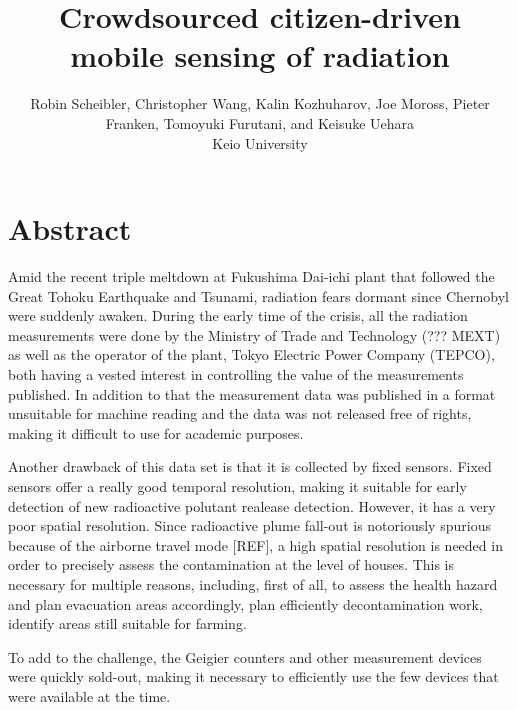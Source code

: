 \documentclass[11pt]{article}
\newcommand*{\TitleFont}{%
  \Large\usefont{T1}{phv}{b}{n}%
    \selectfont}
\newcommand*{\AuthorFont}{%
  \normalsize\usefont{T1}{\rmdefault}{m}{n}%
    \selectfont}
\begin{document}
%
\title{\TitleFont Crowdsourced citizen-driven mobile sensing of radiation}



\author{
  \AuthorFont
  Robin Scheibler, Christopher Wang, Kalin Kozhuharov, Joe Moross, Pieter Franken, Tomoyuki Furutani, and Keisuke Uehara \\
  Keio University
}

\maketitle

\section*{Abstract}
\label{sec:abstract}

Amid the recent triple meltdown at Fukushima Dai-ichi plant that followed the Great Tohoku Earthquake and Tsunami, radiation fears dormant since Chernobyl were suddenly awaken.
During the early time of the crisis, all the radiation measurements were done by the Ministry of Trade and Technology (??? MEXT) as well as the operator of the
plant, Tokyo Electric Power Company (TEPCO), both having a vested interest in controlling the value of the measurements published. In addition to that the measurement
data was published in a format unsuitable for machine reading and the data was not released free of rights, making it difficult to use for academic purposes.

Another drawback of this data set is that it is collected by fixed sensors. Fixed sensors offer a really good temporal resolution, making it suitable for
early detection of new radioactive polutant realease detection. However, it has a very poor spatial resolution. Since radioactive plume fall-out is notoriously
spurious because of the airborne travel mode [REF], a high spatial resolution is needed in order to precisely assess the contamination at the level of houses.
This is necessary for multiple reasons, including, first of all, to assess the health hazard and plan evacuation areas accordingly, plan efficiently decontamination
work, identify areas still suitable for farming.

To add to the challenge, the Geigier counters and other measurement devices were quickly sold-out, making it necessary to efficiently use the few devices that
were available at the time.
\end{document}
